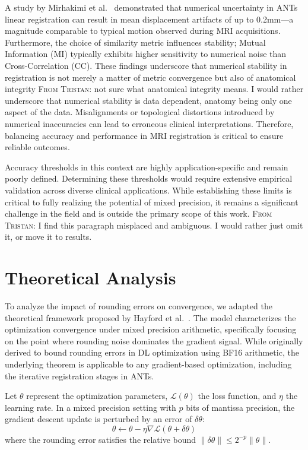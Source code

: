 \documentclass[journal,twoside,web]{ieeecolor}
\newcommand{\TG}[1]{\color{blue}\textsc{From Tristan: }#1\color{black}}
\begin{document}
A study by Mirhakimi et al.~\cite{Mirhakimi2025-qb} demonstrated that numerical
uncertainty in ANTs linear registration can result in mean displacement
artifacts of up to 0.2mm---a magnitude comparable to typical motion observed
during MRI acquisitions. Furthermore, the choice of similarity metric influences
stability; Mutual Information (MI) typically exhibits higher sensitivity to
numerical noise than Cross-Correlation (CC). These findings underscore that
numerical stability in registration is not merely a matter of metric convergence
but also of anatomical integrity \TG{not sure what anatomical integrity means. I
would rather underscore that numerical stability is data dependent, anatomy
being only one aspect of the data}. Misalignments or topological distortions
introduced by numerical inaccuracies can lead to erroneous clinical
interpretations. Therefore, balancing accuracy and performance in MRI
registration is critical to ensure reliable outcomes.

Accuracy thresholds in this context are highly application-specific and remain
poorly defined. Determining these thresholds would require extensive empirical
validation across diverse clinical applications. While establishing these limits
is critical to fully realizing the potential of mixed precision, it remains a
significant challenge in the field and is outside the primary scope of this
work. \TG{I find this paragraph misplaced and ambiguous. I would rather just
omit it, or move it to results.}

\section{Theoretical Analysis}
\label{sec:theory}
To analyze the impact of rounding errors on convergence, we adapted the theoretical framework proposed by Hayford et al.~\cite{Hayford2024-kb}. The model characterizes the optimization convergence under mixed precision arithmetic, specifically focusing on the point where rounding noise dominates the gradient signal. While originally derived to bound rounding errors in DL optimization using BF16 arithmetic, the underlying theorem is applicable to any gradient-based optimization, including the iterative registration stages in ANTs.

Let $\theta$ represent the optimization parameters, $\mathcal{L}(\theta)$
the loss function, and $\eta$ the learning rate. In a mixed precision setting
with $p$ bits of mantissa precision, the gradient descent update is perturbed by
an error of $\delta\theta$:
\begin{equation}
	\theta \leftarrow \theta - \eta \nabla\mathcal{L}(\theta + \delta\theta)
\end{equation}
where the rounding error satisfies the relative bound $\|\delta\theta\| \leq 2^{-p} \|\theta\|$.
\end{document}
